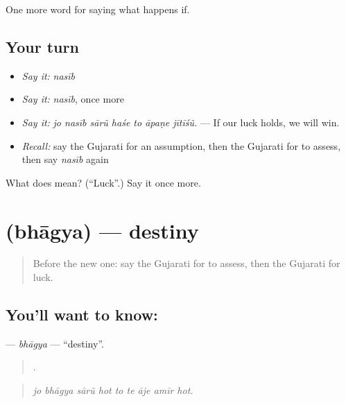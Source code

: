 \begin{grammarlens}[title={What you've built}]
One more word for saying what happens if.
\end{grammarlens}

\subsection*{Your turn}
\begin{itemize}
\raggedright
  \item \emph{Say it:} \emph{nasīb}
  \item \emph{Say it:} \emph{nasīb}, once more
  \item \emph{Say it:} \emph{jo nasīb sārũ haśe to āpaṇe jītīśũ.} — If our luck holds, we will win.
  \item \emph{Recall:} say the Gujarati for an assumption, then the Gujarati for to assess, then say \emph{nasīb} again
\end{itemize}

\begin{tcolorbox}[breakable,colback=teal!4,colframe=teal!35!black,title={Before you move on}]
What does  mean? (\textquotedblleft{}Luck\textquotedblright{}.) Say it once more.
\end{tcolorbox}
\section[\texorpdfstring{\gu{ભાગ્ય} (bhāgya)}{ભાગ્ય (bhāgya)}]{ (bhāgya) — destiny}

\label{lesson:GU-C368-bhagya}



\begin{quote}
Before the new one: say the Gujarati for to assess, then the Gujarati for luck.
\end{quote}

\subsection*{You'll want to know: }
\textbf{} — \emph{bhāgya} — \textquotedblleft{}destiny\textquotedblright{}.

\begin{quote}
        .
\end{quote}

\begin{quote}
\emph{jo bhāgya sārũ hot to te āje amīr hot.}
\end{quote}

